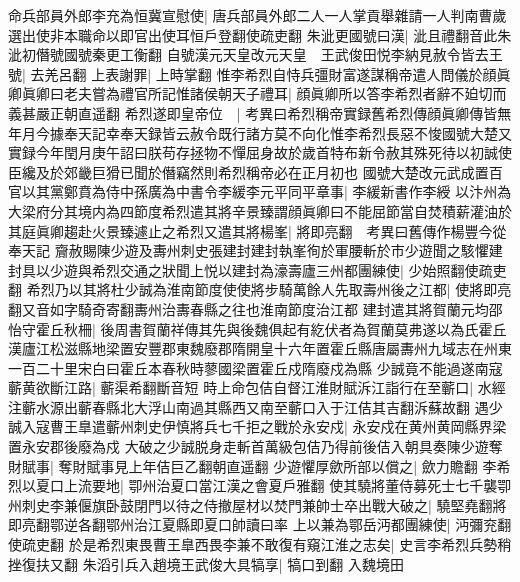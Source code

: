 命兵部員外郎李充為恒冀宣慰使|{
	唐兵部員外郎二人一人掌貢舉雜請一人判南曹歲選出使非本職命以即官出使耳恒戶登翻使疏吏翻}
朱泚更國號曰漢|{
	泚且禮翻音此朱泚初僭號國號秦更工衡翻}
自號漢元天皇改元天皇　王武俊田悦李納見赦令皆去王號|{
	去羌呂翻}
上表謝罪|{
	上時掌翻}
惟李希烈自恃兵彊財富遂謀稱帝遣人問儀於顔眞卿眞卿曰老夫嘗為禮官所記惟諸侯朝天子禮耳|{
	顔眞卿所以答李希烈者辭不廹切而義甚嚴正朝直遥翻}
希烈遂即皇帝位　|{
	考異曰希烈稱帝實録舊希烈傳顔眞卿傳皆無年月今據奉天記幸奉天録皆云赦令既行諸方莫不向化惟李希烈長惡不悛國號大楚又實録今年閏月庚午詔曰朕苟存拯物不憚屈身故於歲首特布新令赦其殊死待以初誠使臣纔及於郊畿巨猾已聞於僭竊然則希烈稱帝必在正月初也}
國號大楚改元武成置百官以其黨鄭賁為侍中孫廣為中書令李緩李元平同平章事|{
	李緩新書作李綬}
以汴州為大梁府分其境内為四節度希烈遣其將辛景臻謂顔眞卿曰不能屈節當自焚積薪灌油於其庭眞卿趨赴火景臻遽止之希烈又遣其將楊峯|{
	將即亮翻　考異曰舊傳作楊豐今從奉天記}
齎赦賜陳少遊及夀州刺史張建封建封執峯徇於軍腰斬於市少遊聞之駭懼建封具以少遊與希烈交通之狀聞上悦以建封為濠壽廬三州都團練使|{
	少始照翻使疏吏翻}
希烈乃以其將杜少誠為淮南節度使使將步騎萬餘人先取壽州後之江都|{
	使將即亮翻又音如字騎奇寄翻夀州治夀春縣之往也淮南節度治江都}
建封遣其將賀蘭元均邵怡守霍丘秋柵|{
	後周書賀蘭祥傳其先與後魏俱起有紇伏者為賀蘭莫弗遂以為氏霍丘漢廬江松滋縣地梁置安豐郡東魏廢郡隋開皇十六年置霍丘縣唐屬夀州九域志在州東一百二十里宋白曰霍丘本春秋時蓼國梁置霍丘戍隋廢戍為縣}
少誠竟不能過遂南寇蘄黄欲斷江路|{
	蘄渠希翻斷音短}
時上命包佶自督江淮財賦泝江詣行在至蘄口|{
	水經注蘄水源出蘄春縣北大浮山南過其縣西又南至蘄口入于江佶其吉翻泝蘇故翻}
遇少誠入寇曹王臯遣蘄州刺史伊慎將兵七千拒之戰於永安戍|{
	永安戍在黄州黄岡縣界梁置永安郡後廢為戍}
大破之少誠脱身走斬首萬級包佶乃得前後佶入朝具奏陳少遊奪財賦事|{
	奪財賦事見上年佶巨乙翻朝直遥翻}
少遊懼厚歛所部以償之|{
	歛力贍翻}
李希烈以夏口上流要地|{
	卾州治夏口當江漢之會夏戶雅翻}
使其驍將董侍募死士七千襲卾州刺史李兼偃旗卧鼓閉門以待之侍撤屋材以焚門兼帥士卒出戰大破之|{
	驍堅堯翻將即亮翻鄂逆各翻鄂州治江夏縣即夏口帥讀曰率}
上以兼為鄂岳沔都團練使|{
	沔彌兖翻使疏吏翻}
於是希烈東畏曹王臯西畏李兼不敢復有窺江淮之志矣|{
	史言李希烈兵勢稍挫復扶又翻}
朱滔引兵入趙境王武俊大具犒享|{
	犒口到翻}
入魏境田

